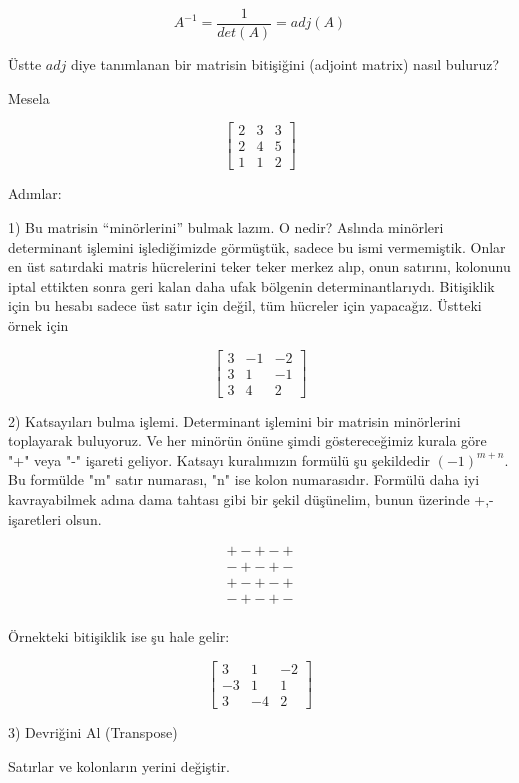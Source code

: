 \documentclass[12pt,fleqn]{article}\usepackage{../../common}
\begin{document}
$$ A^{-1} = \frac{1}{det(A)}  = adj(A)$$

Üstte $adj$ diye tanımlanan bir matrisin bitişiğini (adjoint matrix) nasıl
buluruz?

Mesela

$$
\left[\begin{array}{rrr}
2 & 3 & 3 \\
2 & 4 & 5 \\
1 & 1 & 2
\end{array}\right]
$$

Adımlar:

1) Bu matrisin ``minörlerini'' bulmak lazım. O nedir? Aslında minörleri
determinant işlemini işlediğimizde görmüştük, sadece bu ismi vermemiştik.  Onlar
en üst satırdaki matris hücrelerini teker teker merkez alıp, onun satırını,
kolonunu iptal ettikten sonra geri kalan daha ufak bölgenin
determinantlarıydı. Bitişiklik için bu hesabı sadece üst satır için değil, tüm
hücreler için yapacağız. Üstteki örnek için

$$
\left[\begin{array}{rrr}
3 & -1 & -2 \\
3 & 1 & -1 \\
3 & 4 & 2
\end{array}\right]
$$


2) Katsayıları bulma işlemi. Determinant işlemini bir matrisin minörlerini
toplayarak buluyoruz. Ve her minörün önüne şimdi göstereceğimiz kurala göre "+"
veya "-" işareti geliyor. Katsayı kuralımızın formülü şu şekildedir
$(-1)^{m+n}$. Bu formülde "m" satır numarası, "n" ise kolon numarasıdır. Formülü
daha iyi kavrayabilmek adına dama tahtası gibi bir şekil düşünelim, bunun
üzerinde +,- işaretleri olsun.

$$
\begin{array}{rr}
+ - + - + \\
- + - + - \\
+ - + - + \\
- + - + - \\
\end{array}
$$


Örnekteki bitişiklik ise şu hale gelir:

$$
\left[\begin{array}{rrr}
3 & 1 & -2 \\
-3 & 1 & 1 \\
3 & -4 & 2
\end{array}\right]
$$

3) Devriğini Al (Transpose)

Satırlar ve kolonların yerini değiştir.
\end{document}
